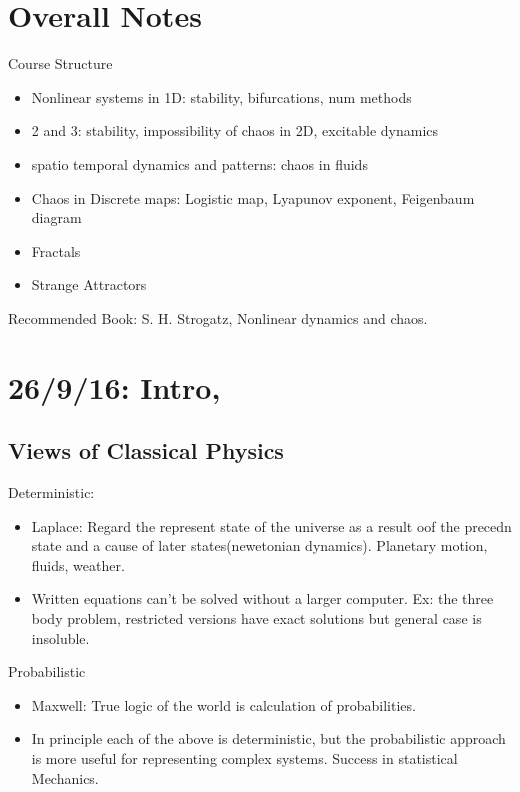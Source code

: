 \documentclass[]{article}
\begin{document}
\large

\section*{Overall Notes}

Course Structure
\begin{itemize}
	\item Nonlinear systems in 1D: stability, bifurcations, num methods
	\item 2 and 3: stability, impossibility of chaos in 2D, excitable dynamics
	\item spatio temporal dynamics and patterns: chaos in fluids
	\item Chaos in Discrete maps: Logistic map, Lyapunov exponent, Feigenbaum diagram
	\item Fractals
	\item Strange Attractors
\end{itemize}

Recommended Book: S. H. Strogatz, Nonlinear dynamics and chaos.

\section{26/9/16: Intro, }

\subsection{Views of Classical Physics}

Deterministic:

\begin{itemize}
	\item  Laplace: Regard the represent state of the universe as a result oof the precedn state and a cause of later states(newetonian dynamics). Planetary motion, fluids, weather.
	\item Written equations can't be solved without a larger computer. Ex: the three body problem, restricted versions have exact solutions but general case is insoluble.

\end{itemize}

Probabilistic

\begin{itemize}
	\item  Maxwell: True logic of the world is calculation of probabilities.
	
\item In principle each of the above is deterministic, but the probabilistic approach is more useful for representing complex systems. Success in statistical Mechanics.
	
\end{itemize}
\end{document}
